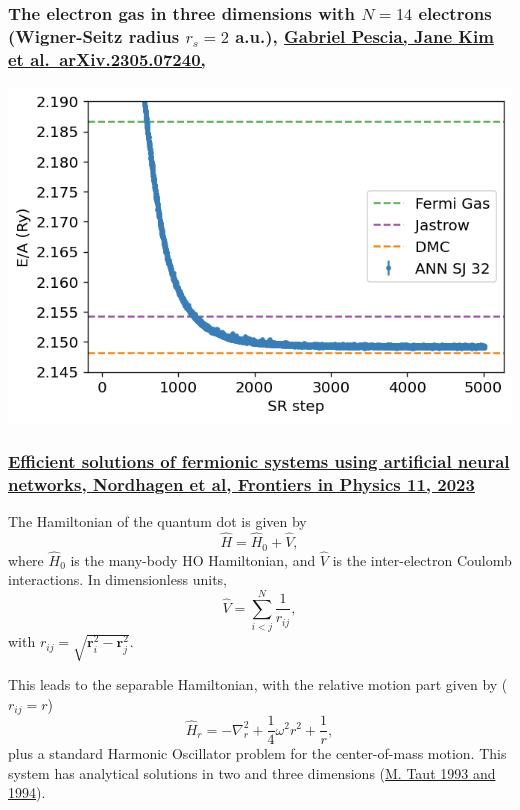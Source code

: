 \documentclass{beamer}
\begin{document}
\begin{frame}
\frametitle{The electron gas in three dimensions with $N=14$ electrons (Wigner-Seitz radius $r_s=2$ a.u.), \href{{https://doi.org/10.48550/arXiv.2305.07240}}{Gabriel Pescia, Jane Kim et al.~arXiv.2305.07240,}}

\begin{block}{}

\vspace{6mm}

\centerline{\includegraphics[width=0.9\linewidth]{figures/elgasnew.png}}

\vspace{6mm}

\end{block}
\end{frame}

\begin{frame}
\frametitle{\href{{https://doi.org/10.3389/fphy.2023.1061580}}{Efficient solutions of fermionic systems using artificial neural networks, Nordhagen et al, Frontiers in Physics 11, 2023}}

The Hamiltonian of the quantum dot is given by
\[ \hat{H} = \hat{H}_0 + \hat{V}, 
\]
where $\hat{H}_0$ is the many-body HO Hamiltonian, and $\hat{V}$ is the
inter-electron Coulomb interactions. In dimensionless units,
\[ \hat{V}= \sum_{i < j}^N \frac{1}{r_{ij}},
\]
with $r_{ij}=\sqrt{\mathbf{r}_i^2 - \mathbf{r}_j^2}$.

This leads to the  separable Hamiltonian, with the relative motion part given by ($r_{ij}=r$)
\[ 
\hat{H}_r=-\nabla^2_r + \frac{1}{4}\omega^2r^2+ \frac{1}{r},
\]
plus a standard Harmonic Oscillator problem  for the center-of-mass motion.
This system has analytical solutions in two and three dimensions (\href{{https://journals.aps.org/pra/abstract/10.1103/PhysRevA.48.3561}}{M. Taut 1993 and 1994}).
\end{frame}
\end{document}
